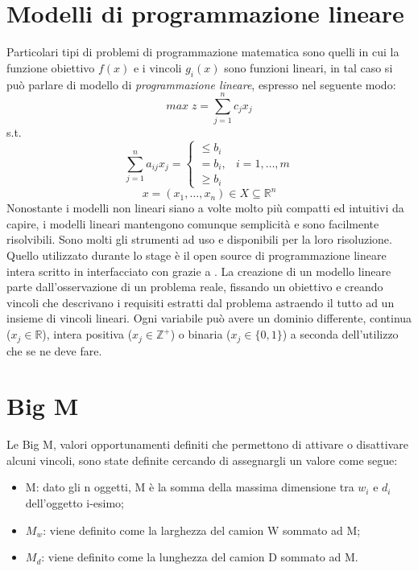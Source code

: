 \section{Modelli di programmazione lineare}
Particolari tipi di problemi di programmazione matematica sono quelli in cui la funzione obiettivo $f(x)$ e i vincoli $g_i(x)$ sono funzioni lineari, in tal caso si può parlare di modello di \textit{programmazione lineare}, espresso nel seguente modo:
$$ max\; z = \sum_{j=1}^n c_j x_j $$
s.t.
$$\sum_{j=1}^n a_{ij} x_j = \begin{cases} \leq b_i \\ = b_i, & i = 1,\dots,m \\ \geq b_i \end{cases}$$
$$x = (x_1,\dots,x_n) \in X \subseteq \mathbb{R}^n$$
Nonostante i modelli non lineari siano a volte molto più compatti ed intuitivi da capire, i modelli lineari mantengono comunque semplicità e sono facilmente risolvibili. Sono molti gli strumenti ad uso  e  disponibili per la loro risoluzione. Quello utilizzato durante lo stage è il  open source di programmazione lineare intera  scritto in  interfacciato con  grazie a . La creazione di un modello lineare parte dall'osservazione di un problema reale, fissando un obiettivo e creando vincoli che descrivano i requisiti estratti dal problema astraendo il tutto ad un insieme di vincoli lineari.
Ogni variabile può avere un dominio differente, continua ($x_j \in \mathbb{R}$), intera positiva ($x_j \in \mathbb{Z}^+$) o binaria ($x_j \in \{0,1\}$) a seconda dell'utilizzo che se ne deve fare.
\section{Big M}
Le Big M, valori opportunamenti definiti che permettono di attivare o disattivare alcuni vincoli, sono state definite cercando di assegnargli un valore come segue:
\begin{itemize}
	\item M: dato gli n oggetti, M è la somma della massima dimensione tra $w_i$ e $d_i$ dell'oggetto i-esimo;
	\item $M_w$: viene definito come la larghezza del camion W sommato ad M;
	\item $M_d$: viene definito come la lunghezza del camion D sommato ad M.
\end{itemize}


